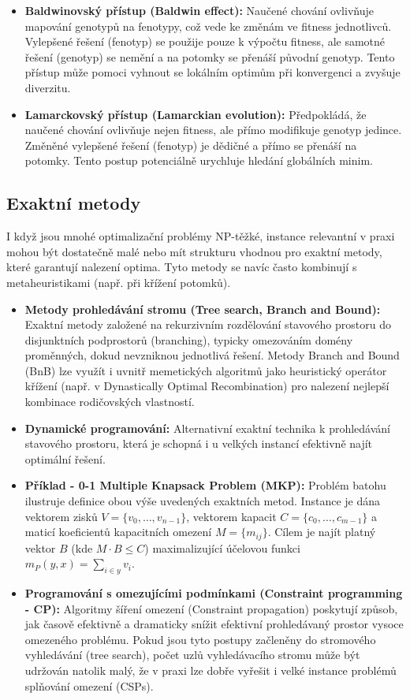 \documentclass[12pt,a4paper]{article}
\theoremstyle{definition}
\begin{document}
\begin{itemize}
    \item \textbf{Baldwinovský přístup (Baldwin effect):} Naučené chování ovlivňuje mapování genotypů na fenotypy, což vede ke změnám ve fitness jednotlivců. Vylepšené řešení (fenotyp) se použije pouze k výpočtu fitness, ale samotné řešení (genotyp) se nemění a na potomky se přenáší původní genotyp. Tento přístup může pomoci vyhnout se lokálním optimům při konvergenci a zvyšuje diverzitu.
    \item \textbf{Lamarckovský přístup (Lamarckian evolution):} Předpokládá, že naučené chování ovlivňuje nejen fitness, ale přímo modifikuje genotyp jedince. Změněné vylepšené řešení (fenotyp) je dědičné a přímo se přenáší na potomky. Tento postup potenciálně urychluje hledání globálních minim.
\end{itemize}

\subsection{Exaktní metody}

I když jsou mnohé optimalizační problémy NP-těžké, instance relevantní v praxi mohou být dostatečně malé nebo mít strukturu vhodnou pro exaktní metody, které garantují nalezení optima. Tyto metody se navíc často kombinují s metaheuristikami (např. při křížení potomků).

\begin{itemize}
    \item \textbf{Metody prohledávání stromu (Tree search, Branch and Bound):} Exaktní metody založené na rekurzivním rozdělování stavového prostoru do disjunktních podprostorů (branching), typicky omezováním domény proměnných, dokud nevzniknou jednotlivá řešení. Metody Branch and Bound (BnB) lze využít i uvnitř memetických algoritmů jako heuristický operátor křížení (např. v Dynastically Optimal Recombination) pro nalezení nejlepší kombinace rodičovských vlastností.
    \item \textbf{Dynamické programování:} Alternativní exaktní technika k prohledávání stavového prostoru, která je schopná i u velkých instancí efektivně najít optimální řešení.
    \item \textbf{Příklad - 0-1 Multiple Knapsack Problem (MKP):} Problém batohu ilustruje definice obou výše uvedených exaktních metod. Instance je dána vektorem zisků $V = \{v_0, \dots, v_{n-1}\}$, vektorem kapacit $C = \{c_0, \dots, c_{m-1}\}$ a maticí koeficientů kapacitních omezení $M = \{m_{ij}\}$. Cílem je najít platný vektor $B$ (kde $M \cdot B \le C$) maximalizující účelovou funkci $m_P(y, x) = \sum_{i \in y} v_i$.
    \item \textbf{Programování s omezujícími podmínkami (Constraint programming - CP):} Algoritmy šíření omezení (Constraint propagation) poskytují způsob, jak časově efektivně a dramaticky snížit efektivní prohledávaný prostor vysoce omezeného problému. Pokud jsou tyto postupy začleněny do stromového vyhledávání (tree search), počet uzlů vyhledávacího stromu může být udržován natolik malý, že v praxi lze dobře vyřešit i velké instance problémů splňování omezení (CSPs).
\end{itemize}
\end{document}
